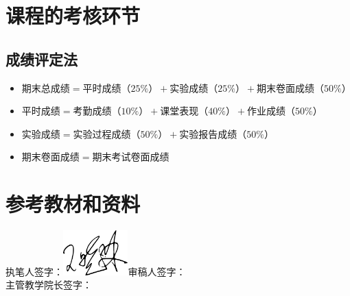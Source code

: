 \documentclass{swfusyllabus}
\begin{document}
\section{课程的考核环节}

\subsection{成绩评定法}

\begin{itemize}
\item \(期末总成绩=平时成绩（25\%）+实验成绩（25\%）+期末卷面成绩（50\%）\)
\item \(平时成绩=考勤成绩（10\%）+课堂表现（40\%）+作业成绩（50\%）\)
\item \(实验成绩 = 实验过程成绩（50\%）+ 实验报告成绩（50\%）\)
\item \(期末卷面成绩 = 期末考试卷面成绩\)
\end{itemize}

\section{参考教材和资料}


\booklist{}

\vfill
\begin{flushright}
  执笔人签字：\includegraphics[width=25mm]{wangxiaolin}\qquad 审稿人签字：\makebox[2cm][c]{}\\
  主管教学院长签字：\makebox[2cm][c]{}
\end{flushright}
\end{document}
